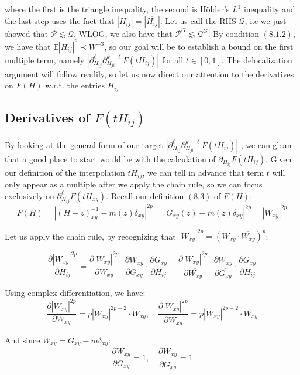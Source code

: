 \documentclass[11pt]{article}
\begin{document}
where the first is the triangle inequality, the second is Hölder's $L^1$ inequality and the last step uses the fact that $|H_{ij}| = \left\vert\overline{H_{ij}}\right\vert$. Let us call the RHS $\mathcal{Q}$, i.e we just showed that $\mathcal{P}\lesssim \mathcal{Q}$. WLOG, we also have that $\mathcal{P}^G\lesssim \mathcal{Q}^G$. By condition $(8.1.2)$, we have that $\mathbb{E}|H_{ij}|^6\prec W^{-3}$, so our goal will be to establish a bound on the first multiple term, namely $\left\vert \partial_{H_{ij}}^\ell \partial_{H_{ji}}^{k-\ell} F(tH_{ij})\right\vert$ for all $t\in [0, 1]$. The delocalization argument will follow readily, so let us now direct our attention to the derivatives on $F(H)$ w.r.t. the entries $H_{ij}$. 

\subsection{Derivatives of $F(tH_{ij})$}
By looking at the general form of our target $\left\vert \partial_{H_{ij}}^\ell \partial_{H_{ji}}^{k-\ell} F(tH_{ij})\right\vert$ , we can glean that a good place to start would be with the calculation of $\partial_{H_{ij}}F(tH_{ij})$. Given our definition of the interpolation $tH_{ij}$, we can tell in advance that term $t$ will only appear as a multiple after we apply the chain rule, so we can focus exclusively on $\partial_{H_{ij}}^\ell F(tH_{xy})$. Recall our definition $(8.3)$ of $F(H)$: 
$$F(H) = \left\vert (H-z)_{xy}^{-1} - m(z)\delta_{xy} \right\vert ^{2p} = \left\vert G_{xy}(z)-m(z)\delta_{xy} \right\vert ^{2p} = |W_{xy}|^{2p}
$$

\noindent Let us apply the chain rule, by recognizing that $|W_{xy}|^{2p} = \left(W_{xy} \cdot \overline{W_{xy}}\right)^p$:

$$\frac{\partial |W_{xy}|^{2p}}{\partial H_{ij}} = \frac{\partial |W_{xy}|^{2p}}{\partial W_{xy}} \cdot \frac{\partial W_{xy}}{\partial G_{xy}} \cdot \frac{\partial G_{xy}}{\partial H_{ij}} + \frac{\partial |W_{xy}|^{2p}}{\partial \overline{W_{xy}}} \cdot \frac{\partial \overline{W_{xy}}}{\partial \overline{G_{xy}}} \cdot \frac{\partial \overline{G_{xy}}}{\partial H_{ij}}$$

\noindent Using complex differentiation, we have: $$\frac{\partial |W_{xy}|^{2p}}{\partial W_{xy}} = p|W_{xy}|^{2p-2} \cdot \overline{W_{xy}}, \quad\frac{\partial |W_{xy}|^{2p}}{\partial \overline{W_{xy}}} = p|W_{xy}|^{2p-2} \cdot W_{xy}$$

\noindent And since $W_{xy} = G_{xy} - m\delta_{xy}$: $$\frac{\partial W_{xy}}{\partial G_{xy}} = 1, \quad \frac{\partial \overline{W_{xy}}}{\partial \overline{G_{xy}}} = 1$$
\end{document}
